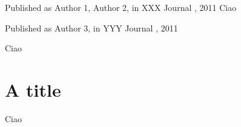 \documentclass[a4paper]{book}
\begin{document}
\mainmatter

  {Published as Author 1, Author 2, in XXX Journal , 2011}
Ciao


  {Published as Author 3, in YYY Journal , 2011}

Ciao


\chapter{A title}

Ciao
\end{document}

